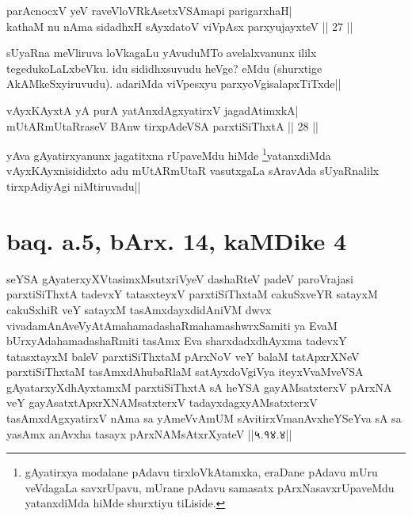 
\begin{shl}
parAcnocxV yeV raveVloVRkAsetxVSAmapi parigarxhaH| \\
kathaM nu nAma sidadhxH sAyxdatoV viVpAsx parxyujayxteV \hfill ||  27 || 
\end{shl}

\begin{artha} 
sUyaRna meVliruva loVkagaLu yAvuduMTo avelalxvanunx ililx 
tegedukoLaLxbeVku. idu sididhxsuvudu heVge? eMdu (shurxtige 
AkAMkeSxyiruvudu). adariMda viVpesxyu parxyoVgisalapxTiTxde||
\end{artha}


\begin{shl}
vAyxKAyxtA yA purA yatAnxdAgxyatirxV jagadAtimxkA| \\
mUtARmUtaRraseV BAnw tirxpAdeVSA parxtiSiThxtA \hfill ||  28 || 
\end{shl}

\begin{artha} 
yAva gAyatirxyanunx jagatitxna rUpaveMdu hiMde 
\footnote[2]{gAyatirxya modalane pAdavu tirxloVkAtamxka, eraDane 
pAdavu mUru veVdagaLa savxrUpavu, mUrane pAdavu samasatx 
pArxNasavxrUpaveMdu yatanxdiMda hiMde shurxtiyu tiLiside.}yatanxdiMda  vAyxKAyxnisididxto adu mUtARmUtaR vasutxgaLa 
sAravAda sUyaRnalilx tirxpAdiyAgi niMtiruvadu||
\end{artha}

\section*{baq. a.5, bArx. 14, kaMDike 4}

\begin{shl}
seYSA gAyaterxyXVtasimxMsutxriVyeV dashaRteV padeV paroVrajasi parxtiSiThxtA tadevxY tatasxteyxV parxtiSiThxtaM cakuSxveYR satayxM cakuSxhiR veY satayxM tasAmxdayxdidAniVM dwvx vivadamAnAveVyAtAmahamadashaRmahamashwrxSamiti ya EvaM bUrxyAdahamadashaRmiti tasAmx Eva sharxdadxdhAyxma tadevxY tatasxtayxM baleV parxtiSiThxtaM pArxNoV veY balaM tatApxrXNeV parxtiSiThxtaM tasAmxdAhubaRlaM satAyxdoVgiVya iteyxVvaMveVSA gAyatarxyXdhAyxtamxM parxtiSiThxtA sA heYSA gayAMsatxterxV pArxNA veY gayAsatxtApxrXNAMsatxterxV tadayxdagxyAMsatxterxV tasAmxdAgxyatirxV nAma sa yAmeVvAmUM sAvitirxVmanAvxheYSeYva sA sa yasAmx anAvxha tasayx pArxNAMsAtxrXyateV ||५.१४.४||
\end{shl}

